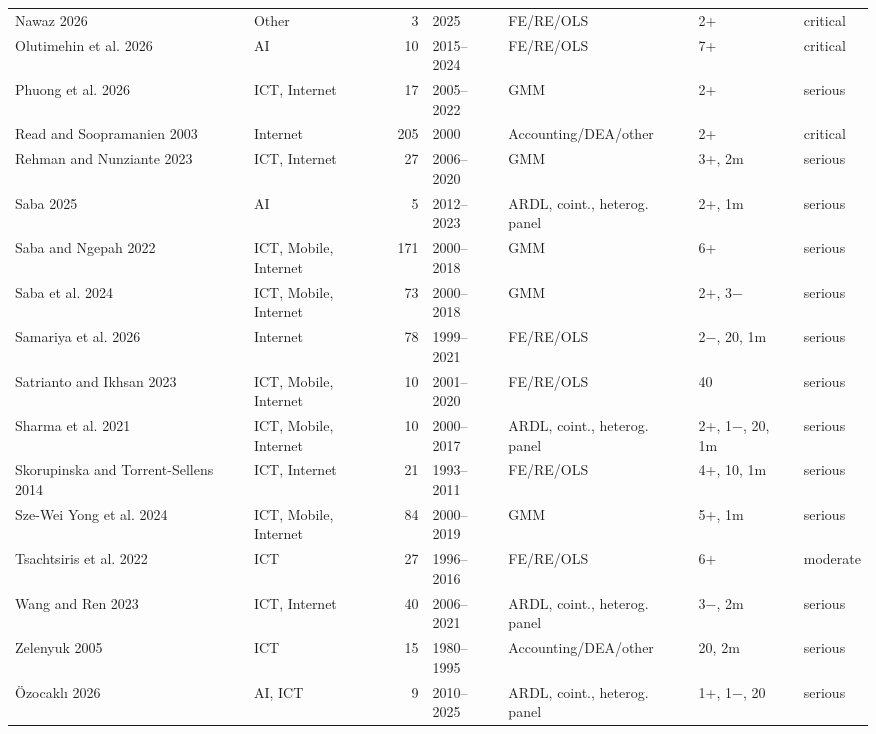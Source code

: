 {\begin{longtable}{@{}p{3.1cm} p{1.9cm} r l p{2.4cm} p{2.3cm} l@{}}
Nawaz 2026 & Other & 3 & 2025 & FE/RE/OLS & 2+ & critical \\
Olutimehin et al. 2026 & AI & 10 & 2015--2024 & FE/RE/OLS & 7+ & critical \\
Phuong et al. 2026 & ICT, Internet & 17 & 2005--2022 & GMM & 2+ & serious \\
Read and Soopramanien 2003 & Internet & 205 & 2000 & Accounting/DEA/other & 2+ & critical \\
Rehman and Nunziante 2023 & ICT, Internet & 27 & 2006--2020 & GMM & 3+, 2m & serious \\
Saba 2025 & AI & 5 & 2012--2023 & ARDL, coint., heterog. panel & 2+, 1m & serious \\
Saba and Ngepah 2022 & ICT, Mobile, Internet & 171 & 2000--2018 & GMM & 6+ & serious \\
Saba et al. 2024 & ICT, Mobile, Internet & 73 & 2000--2018 & GMM & 2+, 3$-$ & serious \\
Samariya et al. 2026 & Internet & 78 & 1999--2021 & FE/RE/OLS & 2$-$, 20, 1m & serious \\
Satrianto and Ikhsan 2023 & ICT, Mobile, Internet & 10 & 2001--2020 & FE/RE/OLS & 40 & serious \\
Sharma et al. 2021 & ICT, Mobile, Internet & 10 & 2000--2017 & ARDL, coint., heterog. panel & 2+, 1$-$, 20, 1m & serious \\
Skorupinska and Torrent-Sellens 2014 & ICT, Internet & 21 & 1993--2011 & FE/RE/OLS & 4+, 10, 1m & serious \\
Sze-Wei Yong et al. 2024 & ICT, Mobile, Internet & 84 & 2000--2019 & GMM & 5+, 1m & serious \\
Tsachtsiris et al. 2022 & ICT & 27 & 1996--2016 & FE/RE/OLS & 6+ & moderate \\
Wang and Ren 2023 & ICT, Internet & 40 & 2006--2021 & ARDL, coint., heterog. panel & 3$-$, 2m & serious \\
Zelenyuk 2005 & ICT & 15 & 1980--1995 & Accounting/DEA/other & 20, 2m & serious \\
Özocaklı 2026 & AI, ICT & 9 & 2010--2025 & ARDL, coint., heterog. panel & 1+, 1$-$, 20 & serious \\
\end{longtable}
}

